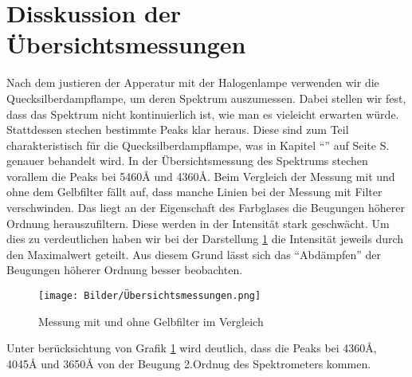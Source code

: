 \section{Disskussion der Übersichtsmessungen}

Nach dem justieren der Apperatur mit der Halogenlampe verwenden wir die Quecksilberdampflampe, um deren Spektrum auszumessen.
Dabei stellen wir fest, dass das Spektrum nicht kontinuierlich ist, wie man es vieleicht erwarten würde.
Stattdessen stechen bestimmte Peaks klar heraus. Diese sind zum Teil charakteristisch für die Quecksilberdampflampe, was in 
Kapitel "`"' auf Seite S.\pageref{Messlit} genauer behandelt wird.\newline
In der Übersichtsmessung des Spektrums stechen vorallem die Peaks bei 5460\r{A} und 4360\r{A}.
Beim Vergleich der Messung mit und ohne dem Gelbfilter fällt auf, dass manche Linien bei der Messung mit Filter verschwinden. Das liegt an der Eigenschaft des 
Farbglases die Beugungen höherer Ordnung herauszufiltern. Diese werden in der Intensität stark geschwächt. Um dies zu verdeutlichen haben wir bei der Darstellung \ref{Übersichtsmessungen}  die Intensität
jeweils durch den Maximalwert geteilt. Aus diesem Grund lässt sich das "`Abdämpfen"' der Beugungen höherer Ordnung besser  beobachten.

\begin{figure}[h]
    \centering
    \texttt{[image: Bilder/Übersichtsmessungen.png]}
    \caption{Messung mit und ohne Gelbfilter im Vergleich}
    \label{Übersichtsmessungen}
\end{figure}

Unter berücksichtung von Grafik \ref{Übersichtsmessungen} wird deutlich, dass die Peaks bei 4360\r{A}, 4045\r{A} und 3650\r{A} von der Beugung 2.Ordnug des Spektrometers kommen.


